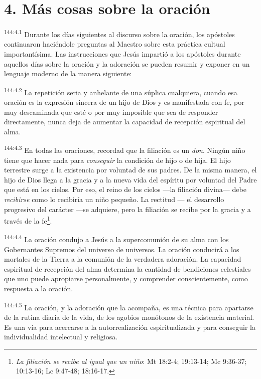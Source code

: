 \section*{4. Más cosas sobre la oración}
\par
\textsuperscript{144:4.1} Durante los días siguientes al discurso sobre la oración, los apóstoles continuaron haciéndole preguntas al Maestro sobre esta práctica cultual importantísima. Las instrucciones que Jesús impartió a los apóstoles durante aquellos días sobre la oración y la adoración se pueden resumir y exponer en un lenguaje moderno de la manera siguiente:

\par
\textsuperscript{144:4.2} La repetición seria y anhelante de una súplica cualquiera, cuando esa oración es la expresión sincera de un hijo de Dios y es manifestada con fe, por muy descaminada que esté o por muy imposible que sea de responder directamente, nunca deja de aumentar la capacidad de recepción espiritual del alma.

\par
\textsuperscript{144:4.3} En todas las oraciones, recordad que la filiación es un \textit{don}. Ningún niño tiene que hacer nada para \textit{conseguir} la condición de hijo o de hija. El hijo terrestre surge a la existencia por voluntad de sus padres. De la misma manera, el hijo de Dios llega a la gracia y a la nueva vida del espíritu por voluntad del Padre que está en los cielos. Por eso, el reino de los cielos ---la filiación divina--- debe \textit{recibirse} como lo recibiría un niño pequeño. La rectitud --- el desarrollo progresivo del carácter ---se adquiere, pero la filiación se recibe por la gracia y a través de la fe\footnote{\textit{La filiación se recibe al igual que un niño}: Mt 18:2-4; 19:13-14; Mc 9:36-37; 10:13-16; Lc 9:47-48; 18:16-17.}.

\par
\textsuperscript{144:4.4} La oración condujo a Jesús a la supercomunión de su alma con los Gobernantes Supremos del universo de universos. La oración conducirá a los mortales de la Tierra a la comunión de la verdadera adoración. La capacidad espiritual de recepción del alma determina la cantidad de bendiciones celestiales que uno puede apropiarse personalmente, y comprender conscientemente, como respuesta a la oración.

\par
\textsuperscript{144:4.5} La oración, y la adoración que la acompaña, es una técnica para apartarse de la rutina diaria de la vida, de los agobios monótonos de la existencia material. Es una vía para acercarse a la autorrealización espiritualizada y para conseguir la individualidad intelectual y religiosa.


